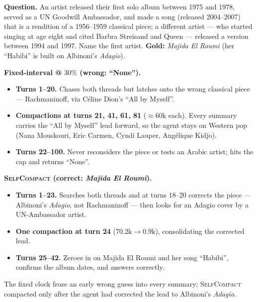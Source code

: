 \documentclass{article}
\newcommand{\method}{\textsc{{SelfCompact}}}
\begin{document}
 \clearpage
\begin{casebox}[title={Case~B: Majida El Roumi --- fixed-interval freezes a wrong lead}]
\textbf{Question.} An artist released their first solo album between 1975 and
1978, served as a UN Goodwill Ambassador, and made a song (released 2004--2007)
that is a rendition of a 1956--1959 classical piece; a different artist --- who
started singing at age eight and cited Barbra Streisand and Queen --- released a
version between 1994 and 1997. Name the first artist. \textbf{Gold:}
\emph{Majida El Roumi} (her ``Habibi'' is built on Albinoni's \emph{Adagio}).
 
\textbf{Fixed-interval @ $30\%$ (wrong: ``None'').}
\begin{itemize}[leftmargin=*]\setlength\itemsep{1pt}
\item \textbf{Turns 1--20.} Chases both threads but latches onto the wrong
classical piece --- Rachmaninoff, via C\'eline Dion's ``All by Myself''.
\item \textbf{Compactions at turns 21, 41, 61, 81} (${\approx}60\mathrm{k}$ each).
Every summary carries the ``All by Myself'' lead forward, so the agent stays on
Western pop (Nana Mouskouri, Eric Carmen, Cyndi Lauper, Ang\'elique Kidjo).
\item \textbf{Turns 22--100.} Never reconsiders the piece or tests an Arabic
artist; hits the cap and returns ``None''.
\end{itemize}
\textbf{\method{} (correct: \emph{Majida El Roumi}).}
\begin{itemize}[leftmargin=*]\setlength\itemsep{1pt}
\item \textbf{Turns 1--23.} Searches both threads and at turns 18--20 corrects
the piece --- Albinoni's \emph{Adagio}, not Rachmaninoff --- then looks for an
Adagio cover by a UN-Ambassador artist.
\item \textbf{One compaction at turn 24} ($70.2\mathrm{k}\to0.9\mathrm{k}$),
consolidating the corrected lead.
\item \textbf{Turns 25--42.} Zeroes in on Majida El Roumi and her song
``Habibi'', confirms the album dates, and answers correctly.
\end{itemize}
The fixed clock froze an early wrong guess into every summary; \method{}
compacted only after the agent had corrected the lead to Albinoni's \emph{Adagio}.
\end{casebox}
 
\end{document}
